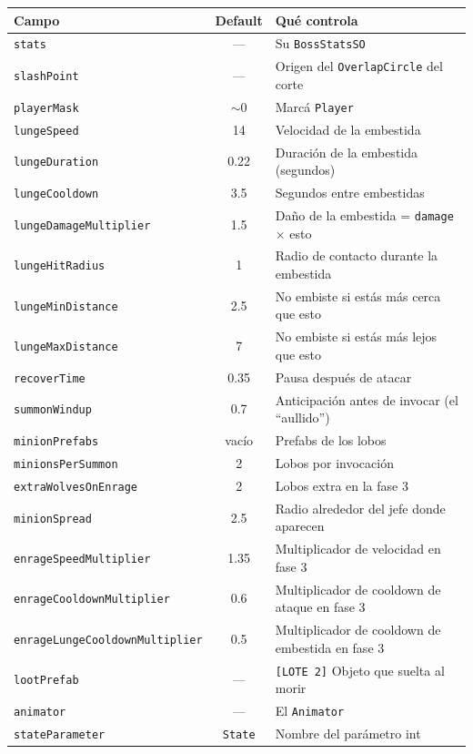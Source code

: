 \documentclass[a4paper,12pt]{article}
\newcommand{\code}[1]{\texttt{#1}}
\begin{document}
\begin{center}
\begin{longtable}{|l|c|p{6.2cm}|}
\hline
\textbf{Campo} & \textbf{Default} & \textbf{Qué controla} \\
\hline
\endhead
\code{stats} & --- & Su \code{BossStatsSO} \\
\hline
\code{slashPoint} & --- & Origen del \code{OverlapCircle} del corte \\
\hline
\code{playerMask} & $\sim$0 & Marcá \code{Player} \\
\hline
\code{lungeSpeed} & 14 & Velocidad de la embestida \\
\hline
\code{lungeDuration} & 0.22 & Duración de la embestida (segundos) \\
\hline
\code{lungeCooldown} & 3.5 & Segundos entre embestidas \\
\hline
\code{lungeDamageMultiplier} & 1.5 & Daño de la embestida = \code{damage} $\times$ esto \\
\hline
\code{lungeHitRadius} & 1 & Radio de contacto durante la embestida \\
\hline
\code{lungeMinDistance} & 2.5 & No embiste si estás más cerca que esto \\
\hline
\code{lungeMaxDistance} & 7 & No embiste si estás más lejos que esto \\
\hline
\code{recoverTime} & 0.35 & Pausa después de atacar \\
\hline
\code{summonWindup} & 0.7 & Anticipación antes de invocar (el ``aullido'') \\
\hline
\code{minionPrefabs} & vacío & Prefabs de los lobos \\
\hline
\code{minionsPerSummon} & 2 & Lobos por invocación \\
\hline
\code{extraWolvesOnEnrage} & 2 & Lobos extra en la fase 3 \\
\hline
\code{minionSpread} & 2.5 & Radio alrededor del jefe donde aparecen \\
\hline
\code{enrageSpeedMultiplier} & 1.35 & Multiplicador de velocidad en fase 3 \\
\hline
\code{enrageCooldownMultiplier} & 0.6 & Multiplicador de cooldown de ataque en fase 3 \\
\hline
\code{enrageLungeCooldownMultiplier} & 0.5 & Multiplicador de cooldown de embestida en fase 3 \\
\hline
\code{lootPrefab} & --- & \code{[LOTE 2]} Objeto que suelta al morir \\
\hline
\code{animator} & --- & El \code{Animator} \\
\hline
\code{stateParameter} & \code{State} & Nombre del parámetro int \\
\hline
\end{longtable}
\end{center}
\end{document}
